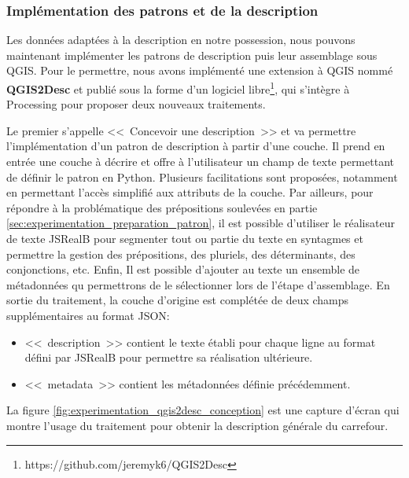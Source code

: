 \subsubsection{Implémentation des patrons et de la description}

\label{sec:experimentation_implémentation_patron}

Les données adaptées à la description en notre possession, nous pouvons maintenant implémenter les patrons de description puis leur assemblage sous QGIS. Pour le permettre, nous avons implémenté une extension à QGIS nommé \textbf{QGIS2Desc} et publié sous la forme d’un logiciel libre\footnote{https://github.com/jeremyk6/QGIS2Desc}, qui s'intègre à Processing pour proposer deux nouveaux traitements.

\newpar{}

Le premier s'appelle <<~Concevoir une description~>> et va permettre l'implémentation d'un patron de description à partir d'une couche. Il prend en entrée une couche à décrire et offre à l'utilisateur un champ de texte permettant de définir le patron en Python. Plusieurs facilitations sont proposées, notamment en permettant l'accès simplifié aux attributs de la couche. Par ailleurs, pour répondre à la problématique des prépositions soulevées en partie \ref{sec:experimentation_preparation_patron}, il est possible d'utiliser le réalisateur de texte JSRealB \citep{molins2015} pour segmenter tout ou partie du texte en syntagmes et permettre la gestion des prépositions, des pluriels, des déterminants, des conjonctions, etc. Enfin, Il est possible d'ajouter au texte un ensemble de métadonnées qu permettrons de le sélectionner lors de l'étape d'assemblage. En sortie du traitement, la couche d'origine est complétée de deux champs supplémentaires au format JSON:

\begin{itemize}
    \item <<~description~>> contient le texte établi pour chaque ligne au format défini par JSRealB pour permettre sa réalisation ultérieure.
    \item <<~metadata~>> contient les métadonnées définie précédemment.
\end{itemize}

La figure \ref{fig:experimentation_qgis2desc_conception} est une capture d'écran qui montre l'usage du traitement pour obtenir la description générale du carrefour.

